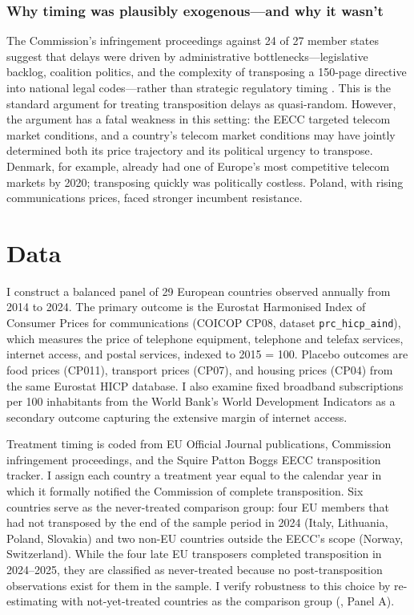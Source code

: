 \documentclass[12pt]{article}
\begin{document}
\subsubsection*{Why timing was plausibly exogenous---and why it wasn't} The Commission's infringement proceedings against 24 of 27 member states suggest that delays were driven by administrative bottlenecks---legislative backlog, coalition politics, and the complexity of transposing a 150-page directive into national legal codes---rather than strategic regulatory timing \citep{falkner2005complying}. This is the standard argument for treating transposition delays as quasi-random. However, the argument has a fatal weakness in this setting: the EECC targeted telecom market conditions, and a country's telecom market conditions may have jointly determined both its price trajectory and its political urgency to transpose. Denmark, for example, already had one of Europe's most competitive telecom markets by 2020; transposing quickly was politically costless. Poland, with rising communications prices, faced stronger incumbent resistance.

\section{Data}

I construct a balanced panel of 29 European countries observed annually from 2014 to 2024. The primary outcome is the Eurostat Harmonised Index of Consumer Prices for communications (COICOP CP08, dataset \texttt{prc\_hicp\_aind}), which measures the price of telephone equipment, telephone and telefax services, internet access, and postal services, indexed to 2015 = 100. Placebo outcomes are food prices (CP011), transport prices (CP07), and housing prices (CP04) from the same Eurostat HICP database. I also examine fixed broadband subscriptions per 100 inhabitants from the World Bank's World Development Indicators as a secondary outcome capturing the extensive margin of internet access.

Treatment timing is coded from EU Official Journal publications, Commission infringement proceedings, and the Squire Patton Boggs EECC transposition tracker. I assign each country a treatment year equal to the calendar year in which it formally notified the Commission of complete transposition. Six countries serve as the never-treated comparison group: four EU members that had not transposed by the end of the sample period in 2024 (Italy, Lithuania, Poland, Slovakia) and two non-EU countries outside the EECC's scope (Norway, Switzerland). While the four late EU transposers completed transposition in 2024--2025, they are classified as never-treated because no post-transposition observations exist for them in the sample. I verify robustness to this choice by re-estimating with not-yet-treated countries as the comparison group (, Panel A).
\end{document}
